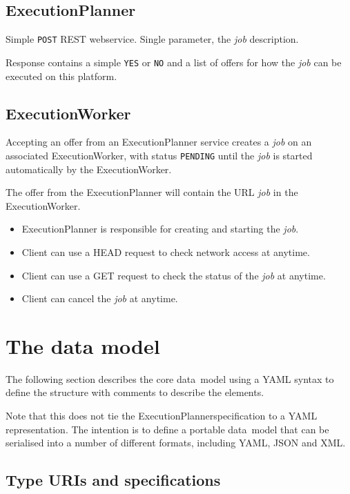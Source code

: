 \documentclass[11pt,a4paper]{ivoa}
\newcommand{\datamodel} {data~model}
\newcommand{\execplanner} {ExecutionPlanner}
\newcommand{\execworker} {ExecutionWorker}
\newcommand{\codeword}[1] {\texttt{#1}}
\newcommand{\job} {\textit{job}}
\begin{document}
\subsection{ExecutionPlanner}
\label{execution-planner-spec}

Simple \codeword{POST} REST webservice.
Single parameter, the \job{} description.

Response contains a simple \codeword{YES} or \codeword{NO}
and a list of offers for how the \job{} can be executed on this platform.

\subsection{ExecutionWorker}
\label{execution-worker-spec}

Accepting an offer from an \execplanner{} service creates a \job{} on an associated \execworker{},
with status \codeword{PENDING} until the \job{} is started automatically by the \execworker{}.

The offer from the \execplanner{} will contain the URL \job{} in the \execworker{}.

\begin{itemize}
    \item \execplanner{} is responsible for creating and starting the \job{}.
    \item Client can use a HEAD request to check network access at anytime.
    \item Client can use a GET request to check the status of the \job{} at anytime.
    \item Client can cancel the \job{} at anytime.
\end{itemize}

\pagebreak

\section{The data model}
\label{datamodel}

The following section describes the core \datamodel{} using a YAML syntax
to define the structure with comments to describe the elements.

Note that this does not tie the \execplanner specification to a YAML representation.
The intention is to define a portable \datamodel{} that can be serialised
into a number of different formats, including YAML, JSON and XML.

\subsection{Type URIs and specifications}
\label{type-and-spec}
\end{document}
